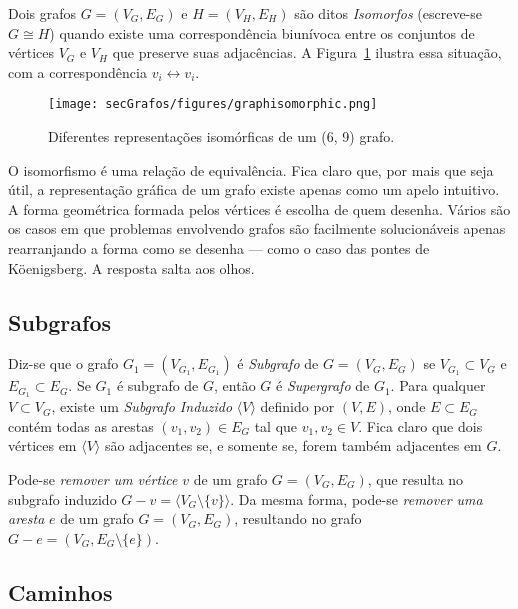 Dois grafos $G = (V_G, E_G)$ e $H = (V_H, E_H)$ são ditos \textit{Isomorfos} (escreve-se $G \cong H$) quando existe uma correspondência biunívoca entre os conjuntos de vértices $V_G$ e $V_H$ que preserve suas adjacências. A Figura~\ref{fig:graphisomorphic} ilustra essa situação, com a correspondência $v_i \longleftrightarrow v_i$.

\begin{figure}[H]
	\begin{center}
		\texttt{[image: secGrafos/figures/graphisomorphic.png]}
	\end{center}
	\caption{Diferentes representações isomórficas de um (6, 9) grafo.}
	\label{fig:graphisomorphic}
\end{figure}

O isomorfismo é uma relação de equivalência. Fica claro que, por mais que seja útil, a representação gráfica de um grafo existe apenas como um apelo intuitivo. A forma geométrica formada pelos vértices é escolha de quem desenha. Vários são os casos em que problemas envolvendo grafos são facilmente solucionáveis apenas rearranjando a forma como se desenha --- como o caso das pontes de Köenigsberg. A resposta salta aos olhos.

\subsection*{Subgrafos}

Diz-se que o grafo $G_1 = (V_{G_1}, E_{G_1})$ é \textit{Subgrafo} de $G = (V_G, E_G)$ se $V_{G_1} \subset V_G$ e $E_{G_1} \subset E_G$. Se $G_1$ é subgrafo de $G$, então $G$ é \textit{Supergrafo} de $G_1$. Para qualquer $V \subset V_G$, existe um \textit{Subgrafo Induzido} $\langle V \rangle$ definido por $(V, E)$, onde $E \subset E_G$ contém todas as arestas $(v_1, v_2) \in E_G$ tal que $v_1, v_2 \in V$. 
Fica claro que dois vértices em $\langle V \rangle$ são adjacentes se, e somente se, forem também adjacentes em $G$.

Pode-se \textit{remover um vértice} $v$ de um grafo $G = (V_G, E_G)$, que resulta no subgrafo induzido $G - v = \langle V_G \setminus \{v\}\rangle$. Da mesma forma, pode-se \textit{remover uma aresta} $e$ de um grafo $G = (V_G, E_G)$, resultando no grafo $G-e = (V_G, E_G \setminus \{e\})$.

\subsection*{Caminhos}

